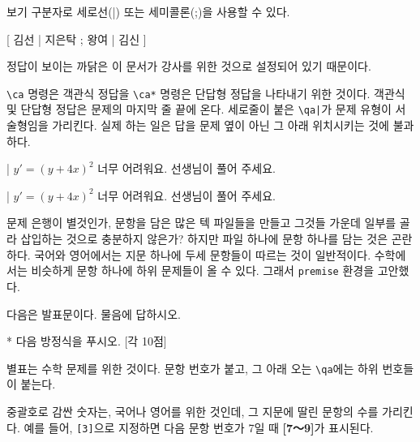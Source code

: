 \documentclass[a4paper]{oblivoir}
\begin{document}
보기 구분자로 세로선(|) 또는 세미콜론(;)을 사용할 수 있다.

\begin{example}
[ 
김선 | 
지은탁 ; 
왕여 | 
김신 
]{
}
\end{example}

정답이 보이는 까닭은 이 문서가 강사를 위한 것으로 설정되어 있기 때문이다.

\begin{boxedverbatim}
\end{boxedverbatim}

\verb|\ca| 명령은 객관식 정답을 \verb|\ca*| 명령은 단답형 정답을 나타내기 위한 것이다.
객관식 및 단답형 정답은 문제의 마지막 줄 끝에 온다.
세로줄이 붙은 \verb_\qa|_가 문제 유형이 서술형임을 가리킨다. 실제 하는 일은 답을 문제 옆이 아닌 그 아래 위치시키는 것에 불과하다.

\begin{boxedverbatim}
\qa|{
$y' = (y + 4x)^2$
}{
너무 어려워요.
선생님이 풀어 주세요.
}
\end{boxedverbatim}

\begin{example}
\qa|{
$y' = (y + 4x)^2$
}{
너무 어려워요.
선생님이 풀어 주세요.
}
\end{example}

문제 은행이 별것인가, 문항을 담은 많은 텍 파일들을 만들고 그것들 가운데 일부를 골라 삽입하는 것으로 충분하지 않은가?
하지만 파일 하나에 문항 하나를 담는 것은 곤란하다.
국어와 영어에서는 지문 하나에 두세 문항들이 따르는 것이 일반적이다.
수학에서는 비슷하게 문항 하나에 하위 문제들이 올 수 있다. 
그래서 \texttt{premise} 환경을 고안했다.

\begin{boxedverbatim}
\begin{premise}[2]
다음은 발표문이다. 물음에 답하시오.
\end{premise}

\begin{premise}*
다음 방정식을 푸시오. [각 10점]
\end{premise}
\end{boxedverbatim}

별표는 수학 문제를 위한 것이다. 문항 번호가 붙고, 그 아래 오는 \verb|\qa|에는 하위 번호들이 붙는다.

중괄호로 감싼 숫자는, 국어나 영어를 위한 것인데, 그 지문에 딸린 문항의 수를 가리킨다.
예를 들어, \texttt{[3]}으로 지정하면 다음 문항 번호가 7일 때 \textbf{[7〜9]}가 표시된다.
\end{document}
